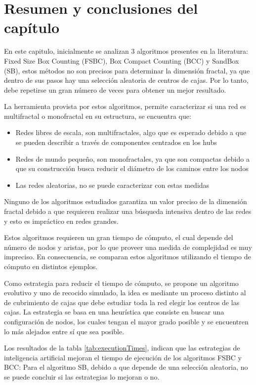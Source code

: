 \newpage
\section{Resumen y conclusiones del capítulo}

En este capitulo, inicialmente se analizan 3 algoritmos presentes en la literatura: Fixed Size Box Counting (FSBC), Box Compact Counting (BCC) y SandBox (SB), estos métodos no son precisos para determinar la dimensión fractal, ya que dentro de sus pasos hay una selección aleatoria de centros de cajas. Por lo tanto, debe repetirse un gran número de veces para obtener un mejor resultado.

La herramienta provista por estos algoritmos, permite caracterizar si una red es multifractal o monofractal en su estructura, se encuentra que:

\begin{itemize}
    \item Redes libres de escala, son multifractales, algo que es esperado debido a que se pueden describir a través de componentes centrados en los hubs
    \item Redes de mundo pequeño, son monofractales, ya que son compactas debido a que su construcción busca reducir el diámetro de los caminos entre los nodos
    \item Las redes aleatorias, no se puede caracterizar con estas medidas
\end{itemize}

Ninguno de los algoritmos estudiados garantiza un valor preciso de la dimensión fractal debido a que requieren realizar una búsqueda intensiva dentro de las redes y esto es impráctico en redes grandes.

Estos algoritmos requieren un gran tiempo de cómputo, el cual depende del número de nodos y aristas, por lo que proveer una medida de complejidad es muy impreciso. En consecuencia, se comparan estos algoritmos utilizando el tiempo de cómputo en distintos ejemplos.

Como estrategia para reducir el tiempo de cómputo, se propone un algoritmo evolutivo y uno de recocido simulado, la idea es mediante un proceso distinto al de cubrimiento de cajas que debe estudiar toda la red elegir los centros de las cajas. La estrategia se basa en una heurística que consiste en buscar una configuración de nodos, los cuales tengan el mayor grado posible y se encuentren lo más alejados entre sí que sea posible.

Los resultados de la tabla \ref{tab:executionTimes}, indican que las estrategias de inteligencia artificial mejoran el tiempo de ejecución de los algoritmos FSBC y BCC: Para el algoritmo SB, debido a que depende de una selección aleatoria, no se puede concluir si las estrategias lo mejoran o no.